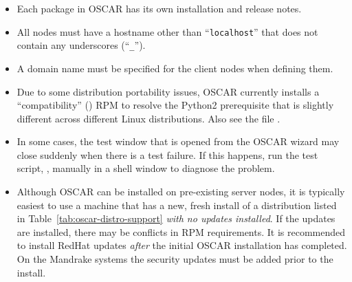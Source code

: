 \begin{itemize}
\item Each package in OSCAR has its own installation and release
  notes.   

\item All nodes must have a hostname other than ``{\tt localhost}''
  that does not contain any underscores (``{\tt \_}'').
  
\item A domain name must be specified for the client nodes when
  defining them.

\item Due to some distribution portability issues, OSCAR currently installs
  a ``compatibility'' () RPM to resolve the
  Python2 prerequisite that is slightly different across different Linux
  distributions.  Also see the file .


\item In some cases, the test window that is opened from the 
  OSCAR wizard may close suddenly when there is a test failure. If
  this happens, run the test script, ,
  manually in a shell window to diagnose the problem.
 
\item Although OSCAR can be installed on pre-existing server nodes, it
  is typically easiest to use a machine that has a new, fresh install
\begchange
  of a distribution listed in Table~\ref{tab:oscar-distro-support}
  {\em with no updates installed}.  If the updates are installed,
  there may be conflicts in RPM requirements.  It is recommended to
  install RedHat updates {\em after} the initial OSCAR installation has
  completed.  On the Mandrake systems the security updates must be added
  prior to the install.
\endchange
  

\end{itemize}
